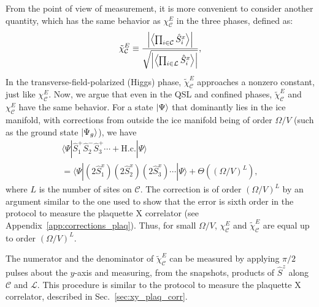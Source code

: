 \documentclass[twocolumn,superscriptaddress,amsmath,amssymb,aps,prx,nofootinbib]{revtex4-2}
\begin{document}
From the point of view of measurement, it is more convenient to consider another quantity,  which has the same behavior as $\chi_\mathcal{C}^E$ in the three phases, defined as:
\begin{equation}
\tilde{\chi}_\mathcal{C}^E \equiv \frac{\abs{ \expval{ \prod_{i\in \mathcal{C}} \hat{S}_i^x  } } }{\sqrt{ \abs{ \expval{ \prod_{i\in \mathcal{L}} \hat{S}_i^x  }  }}},
\end{equation}
In the transverse-field-polarized (Higgs) phase, $\tilde{\chi}_\mathcal{C}^E$ approaches a nonzero constant, just like $\chi_\mathcal{C}^E$. Now, we argue that even in the QSL and confined phases, $\tilde{\chi}_\mathcal{C}^E$ and $\chi_\mathcal{C}^E$ have the same behavior.  
For a state $\ket{\Psi} $ that dominantly lies in the ice manifold, with corrections from outside the ice manifold being of order $\Omega/V$ (such as the ground state $\ket{\Psi_g}$),  we have
\begin{multline}
  \langle \Psi | \hat{S}_1^+ \hat{S}_2^- \hat{S}_3^+ \cdots + \text{H.c.} | \Psi \rangle \\ = \langle \Psi | (2\hat{S}_1^x) (2\hat{S}_2^x) (2\hat{S}_3^x) \cdots |\Psi \rangle + \Theta \left( (\Omega/V)^L \right),
\end{multline}
where $L$ is the number of sites on $\mathcal{C}$. The correction is of order $( \Omega/V )^L$ by an argument similar to the one used to show that the error is sixth order in the protocol to measure the plaquette X correlator (see Appendix~\ref{app:corrections_plaq}). Thus, for small $\Omega/V$, $\chi_\mathcal{C}^E$ and $\tilde{\chi}_\mathcal{C}^E$ are equal up to order $(\Omega/V)^L$. 

The numerator and the denominator of $\tilde{\chi}_\mathcal{C}^E$ can be measured by applying $\pi/2$ pulses about the $y$-axis and measuring, from the snapshots, products of $\hat{S}^z$ along $\mathcal{C}$ and $\mathcal{L}$. This procedure is similar to the protocol to measure the plaquette X correlator, described in Sec.~\ref{sec:xy_plaq_corr}. 
\end{document}

